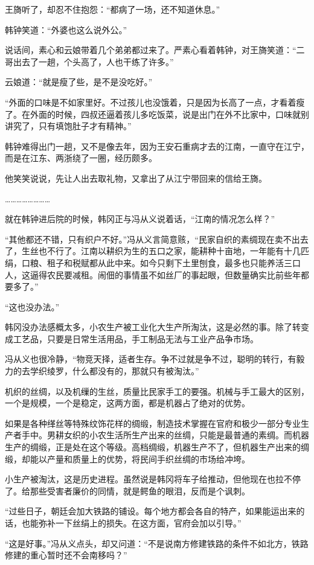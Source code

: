 王旖听了，却忍不住抱怨：“都病了一场，还不知道休息。”

韩钟笑道：“外婆也这么说外公。”

说话间，素心和云娘带着几个弟弟都过来了。严素心看着韩钟，对王旖笑道：“二哥出去了一趟，个头高了，人也干练了许多。”

云娘道：“就是瘦了些，是不是没吃好。”

“外面的口味是不如家里好。不过孩儿也没饿着，只是因为长高了一点，才看着瘦了。在外面的时候，四叔还逼着孩儿多吃饭菜，说是出门在外不比家中，口味就别讲究了，只有填饱肚子才有精神。”

韩钟难得出门一趟，又不是像去年，因为王安石重病才去的江南，一直守在江宁，而是在江东、两浙绕了一圈，经历颇多。

他笑笑说说，先让人出去取礼物，又拿出了从江宁带回来的信给王旖。

……………………

就在韩钟进后院的时候，韩冈正与冯从义说着话，“江南的情况怎么样？”

“其他都还不错，只有织户不好。”冯从义言简意赅，“民家自织的素绸现在卖不出去了，生丝也不行了。江南以耕织为生的五口之家，能耕种十亩地，一年能有十几匹绢，口粮、租子和税赋都从此中来。如今只剩下土里刨食，最多也只能养活三口人，这逼得农民要减租。闹佃的事情虽不如丝厂的事起眼，但数量确实比前些年都要多了。”

“这也没办法。”

韩冈没办法感概太多，小农生产被工业化大生产所淘汰，这是必然的事。除了转变成工艺品，只要是日常生活用品，手工制品无法与工业产品争市场。

冯从义也很冷静，“物竞天择，适者生存。争不过就是争不过，聪明的转行，有毅力的去学织绫罗，什么都没有的，那就只有被淘汰。”

机织的丝绸，以及机缫的生丝，质量比民家手工的要强。机械与手工最大的区别，一个是规模，一个是稳定，这两方面，都是机器占了绝对的优势。

如果是各种缂丝等特殊纹饰花样的绸缎，制造技术掌握在官府和极少一部分专业生产者手中。男耕女织的小农生活所生产出来的丝绸，只能是最普通的素绸。而机器生产的绸缎，正是处在这个等级。高档绸缎，机器生产不了，但机器生产出来的绸缎，却能以产量和质量上的优势，将民间手织丝绸的市场给冲垮。

小生产被淘汰，这是历史进程。虽然说是韩冈将车子给推动，但他现在也拉不停了。给那些受害者廉价的同情，就是鳄鱼的眼泪，反而是个讽刺。

“过些日子，朝廷会加大铁路的铺设。每个地方都会各自的特产，如果能运出来的话，也能弥补一下丝绢上的损失。在这方面，官府会加以引导。”

“这是好事。”冯从义点头，却又问道：“不是说南方修建铁路的条件不如北方，铁路修建的重心暂时还不会南移吗？”

